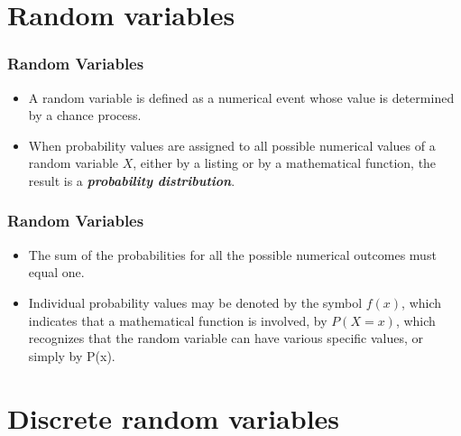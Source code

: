 \documentclass{beamer}
\begin{document}
\section{Random variables}
\begin{frame}
\frametitle{Random Variables}
\vspace{-1cm}
\Large
\begin{itemize}
\item A random variable is defined as a numerical event whose value is determined by a chance process.
\item When probability values are assigned to all possible numerical values of a random variable $X$, either by a listing
or by a mathematical function, the result is a \textit{\textbf{probability distribution}}. 
\end{itemize}
\end{frame}
\begin{frame}
\frametitle{Random Variables}
\Large
\vspace{-1cm}
\begin{itemize}
\item The sum of the probabilities for all the possible numerical outcomes must equal one. 
\item Individual probability values may be denoted by the symbol $f(x)$,
which indicates that a mathematical function is involved, by $P(X=x)$, which recognizes that the random
variable can have various specific values, or simply by P(x).
\end{itemize}
\end{frame}
\section{Discrete random variables}
\end{document}
